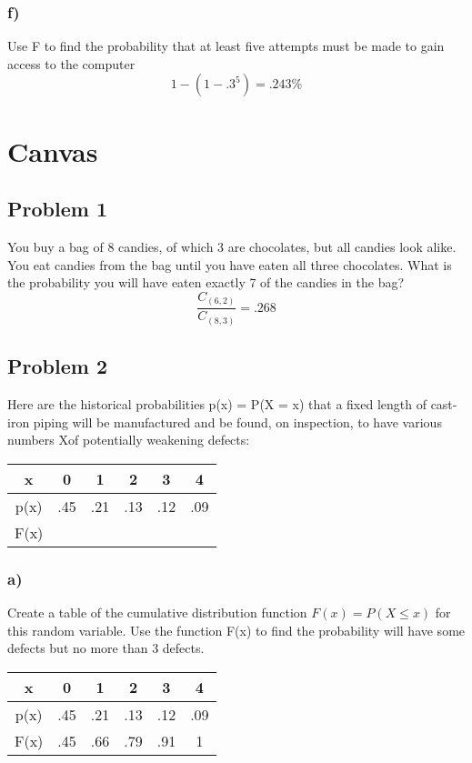 \documentclass{article}
\begin{document}
\subsubsection*{f)}
Use F to find the probability that at least five attempts must be made to gain access to the computer
\begin{equation}
    1 - (1 - .3^5) = .243\%
\end{equation}
\newpage
\section*{Canvas}
\subsection*{Problem 1}
You buy a bag of 8 candies, of which 3 are chocolates, but all candies look alike. You eat candies from the bag until you have eaten all three chocolates. What is the probability you will have eaten exactly 7 of the candies in the bag?
\begin{equation}
    \frac{C_{(6,2)}}{C_{(8,3)}} =.268    
\end{equation}
\subsection*{Problem 2}
Here are the historical probabilities p(x) = P(X = x) that a fixed length of cast-iron piping will be manufactured and be found, on inspection, to have various numbers Xof potentially weakening defects:
\begin{center}
    \begin{tabular}{c|c|c|c|c|c}
        x &  0 & 1 & 2 & 3 & 4\\
        \hline
        p(x) & .45 & .21 & .13 &.12 & .09\\
        F(x) &  & & & & 
    \end{tabular}
\end{center}
\subsubsection*{a)}
Create a table of the cumulative distribution function $F(x) = P(X \leq x)$ for this random variable. Use the function F(x) to find the probability will have some defects but no more than 3 defects.
\begin{center}
    \begin{tabular}{c|c|c|c|c|c}
        x &  0 & 1 & 2 & 3 & 4\\
        \hline
        p(x) & .45 & .21 & .13 &.12 & .09\\
        F(x) & .45 & .66 & .79 & .91 & 1
    \end{tabular}
\end{center}
\end{document}

